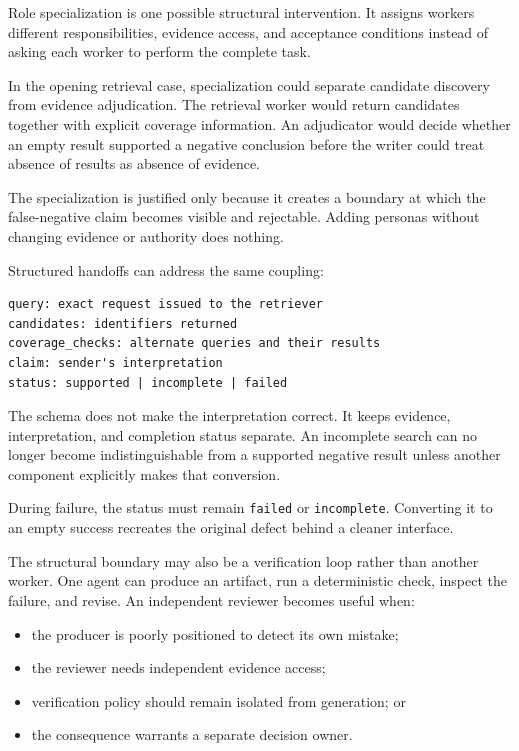 Role specialization is one possible structural intervention. It assigns workers different responsibilities, evidence access, and acceptance conditions instead of asking each worker to perform the complete task.

In the opening retrieval case, specialization could separate candidate discovery from evidence adjudication. The retrieval worker would return candidates together with explicit coverage information. An adjudicator would decide whether an empty result supported a negative conclusion before the writer could treat absence of results as absence of evidence.

The specialization is justified only because it creates a boundary at which the false-negative claim becomes visible and rejectable. Adding personas without changing evidence or authority does nothing.

Structured handoffs can address the same coupling:

\begin{verbatim}
query: exact request issued to the retriever
candidates: identifiers returned
coverage_checks: alternate queries and their results
claim: sender's interpretation
status: supported | incomplete | failed
\end{verbatim}

The schema does not make the interpretation correct. It keeps evidence, interpretation, and completion status separate. An incomplete search can no longer become indistinguishable from a supported negative result unless another component explicitly makes that conversion.

During failure, the status must remain \texttt{failed} or \texttt{incomplete}. Converting it to an empty success recreates the original defect behind a cleaner interface.

The structural boundary may also be a verification loop rather than another worker. One agent can produce an artifact, run a deterministic check, inspect the failure, and revise. An independent reviewer becomes useful when:

\begin{itemize}
\tightlist
\item
  the producer is poorly positioned to detect its own mistake;
\item
  the reviewer needs independent evidence access;
\item
  verification policy should remain isolated from generation; or
\item
  the consequence warrants a separate decision owner.
\end{itemize}

